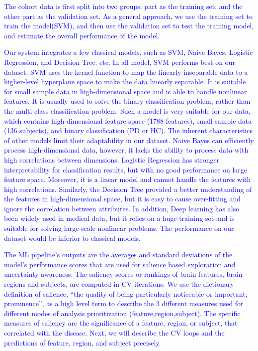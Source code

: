 \textcolor{blue}{The cohort data is first split into two groups: part as the training set, and the other part as the validation set. As a general approach, we use the training set to train the model(SVM), and then use the validation set to test the training model, and estimate the overall performance of the model.} 

\textcolor{blue}{Our system integrates a few classical models, such as SVM, Naive Bayes, Logistic Regression, and Decision Tree. etc. In all model, SVM performs best on our dataset. SVM uses the kernel function to map the linearly inseparable data to a higher-level hyperplane space to make the data linearly separable. It is suitable for small sample data in high-dimensional space and is able to handle nonlinear features. It is usually used to solve the binary classification problem, rather than the multi-class classification problem. Such a model is very suitable for our data, which contains high-dimensional feature space (1788 features), small sample data (136 subjects), and binary classification (PD or HC). The inherent characteristics of other models limit their adaptability in our dataset. Naive Bayes can efficiently process high-dimensional data, however, it lacks the ability to process data with high correlations between dimensions. Logistic Regression has stronger interpretability for classification results, but with no good performance on large feature space. Moreover, it is a linear model and cannot handle the features with high correlations. Similarly, the Decision Tree provided a better understanding of the features in high-dimensional space, but it is easy to cause over-fitting and ignore the correlation between attributes. In addition, Deep learning has also been widely used in medical data, but it relies on a huge training set and is suitable for solving large-scale nonlinear problems. The performance on our dataset would be inferior to classical models.}

\textcolor{blue}{The ML pipeline's outputs are the averages and standard deviations of the model's performance scores that are used for salience based exploration and uncertainty awareness. The saliency scores or rankings of brain features, brain regions and subjects, are computed in CV iterations. We use the dictionary definition of salience, “the quality of being particularly noticeable or important; prominence”, as a high level term to describe the 3 different measures used for different modes of analysis prioritization (feature,region,subject). The specific measures of saliency are the significance of a feature, region, or subject, that correlated with the disease. Next, we will describe the CV loops and the predictions of feature, region, and subject precisely.} 



